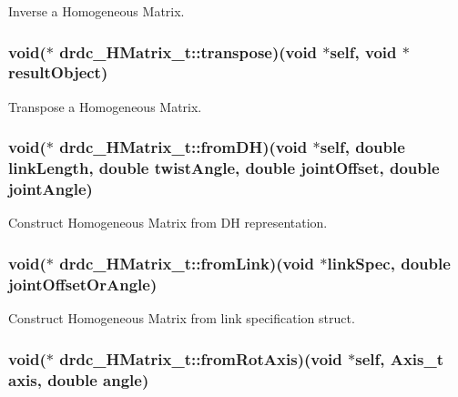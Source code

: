 Inverse a Homogeneous Matrix. 

\hypertarget{structdrdc__HMatrix__t_1f0e7eb07e96722033da212cc9b25518}{
\subsubsection[transpose]{\setlength{\rightskip}{0pt plus 5cm}void($\ast$ {\bf drdc\_\-HMatrix\_\-t::transpose})(void $\ast$self, void $\ast$resultObject)}}
\label{structdrdc__HMatrix__t_1f0e7eb07e96722033da212cc9b25518}


Transpose a Homogeneous Matrix. 

\hypertarget{structdrdc__HMatrix__t_ce4ff366265225689e58b5eee5323170}{
\subsubsection[fromDH]{\setlength{\rightskip}{0pt plus 5cm}void($\ast$ {\bf drdc\_\-HMatrix\_\-t::fromDH})(void $\ast$self, double linkLength, double twistAngle, double jointOffset, double jointAngle)}}
\label{structdrdc__HMatrix__t_ce4ff366265225689e58b5eee5323170}


Construct Homogeneous Matrix from DH representation. 

\hypertarget{structdrdc__HMatrix__t_bdb80598a4a45e67b52ef3a910d4c6f1}{
\subsubsection[fromLink]{\setlength{\rightskip}{0pt plus 5cm}void($\ast$ {\bf drdc\_\-HMatrix\_\-t::fromLink})(void $\ast$linkSpec, double jointOffsetOrAngle)}}
\label{structdrdc__HMatrix__t_bdb80598a4a45e67b52ef3a910d4c6f1}


Construct Homogeneous Matrix from link specification struct. 

\hypertarget{structdrdc__HMatrix__t_db74c31930baca46044d5881184e0ee1}{
\subsubsection[fromRotAxis]{\setlength{\rightskip}{0pt plus 5cm}void($\ast$ {\bf drdc\_\-HMatrix\_\-t::fromRotAxis})(void $\ast$self, {\bf Axis\_\-t} axis, double angle)}}
\label{structdrdc__HMatrix__t_db74c31930baca46044d5881184e0ee1}


